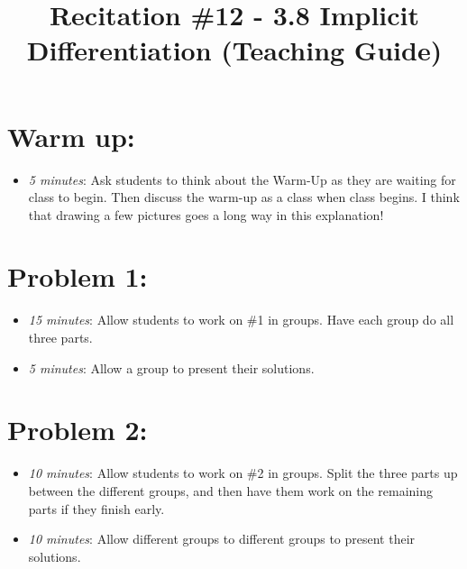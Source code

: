 \documentclass[handout,nooutcomes]{ximera}
\title{Recitation \#12 - 3.8 Implicit Differentiation (Teaching Guide)}
\begin{document}
\begin{abstract}		\end{abstract}
\maketitle


\section*{Warm up:} 
	
	\begin{itemize}
	
	\item  \emph{5 minutes}:  Ask students to think about the Warm-Up as they are waiting for class to begin.  Then discuss the warm-up as a class when class begins.  I think that drawing a few pictures goes a long way in this explanation!
	
	
	
	\end{itemize}


\section*{Problem 1:}

	\begin{itemize}
	
	\item  \emph{15 minutes}:  Allow students to work on \#1 in groups.  Have each group do all three parts.
	
	\item  \emph{5 minutes}:  Allow a group to present their solutions.
	
	\end{itemize}



\section*{Problem 2:}

	\begin{itemize}
	
	\item  \emph{10 minutes}:  Allow students to work on \#2 in groups.  Split the three parts up between the different groups, and then have them work on the remaining parts if they finish early.
		
	\item  \emph{10 minutes}:  Allow different groups to different groups to present their solutions.
				
	\end{itemize}
	
\end{document}
